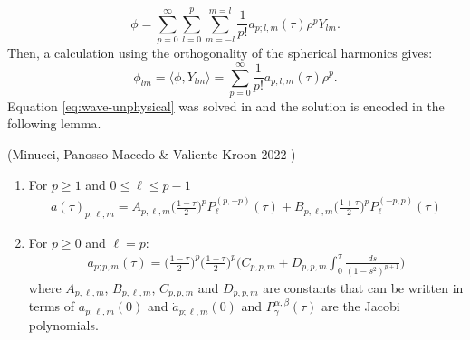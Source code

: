 \documentclass[
11pt, %
english, %
singlespacing, %
headsepline, %
]{MastersDoctoralThesis} %
\begin{document}
\begin{equation}\label{eq:ansatz}
	\phi = \sum_{p = 0}^{\infty}\sum_{l = 0}^{p}\sum_{m = -l}^{m =
          l}\frac{1}{p!}a_{p;l,m}(\tau)\rho^{p}Y_{lm}.
\end{equation}
Then, a calculation using the orthogonality of the spherical
harmonics gives:
\begin{equation}\label{ansatz-1}
	\phi_{lm} = \langle\phi, Y_{lm}\rangle = \sum_{p =
          0}^{\infty}\frac{1}{p!}a_{p;l,m}(\tau)\rho^p .
\end{equation}
Equation \eqref{eq:wave-unphysical} was solved in \cite{MinMacKro22} and the solution is
encoded in the following lemma.
\begin{lemma} (Minucci, Panosso Macedo \& Valiente Kroon 2022 \cite{MinMacKro22})
	\begin{enumerate}
	\item For $p\geq 1$ and $0\leq \ell \leq p-1$
	 \begin{align}\label{eq:lemma1-1}
    a(\tau)_{p;\ell,m} =A_{p,\ell,m}
		  \bigg(\frac{1-\tau}{2}\bigg)^{p}
                  P_{\ell}^{(p,-p)}(\tau) + B_{p,\ell,m}
                  \bigg(\frac{1+\tau}{2}\bigg)^{p}P_{\ell}^{(-p,p)}(\tau)
	 \end{align}
	
	\item For $p\geq 0$ and $\ell=p$:
     \begin{align}\label{eq:lemma1-2}
      {a}_{p;p,m}(\tau) =
      \bigg(\frac{1-\tau}{2}\bigg)^{p}\bigg(\frac{1+\tau}{2}\bigg)^{p}\Bigg(C_{p,p,m}
      +D_{p,p,m}\int_{0}^{\tau} \frac{ds}{(1-s^2)^{p+1}}\Bigg)
     \end{align}
	where $A_{p,\ell,m}$, $B_{p,\ell,m}$, $C_{p,p,m}$ and
        $D_{p,p,m}$ are constants that can be written in terms of
        $a_{p;\ell,m}(0)$ and $\dot{a}_{p;\ell,m}(0)$ and
        $P_{\gamma}^{\alpha, \beta}(\tau)$ are the Jacobi polynomials.
    \end{enumerate}
\end{lemma}
\end{document}
